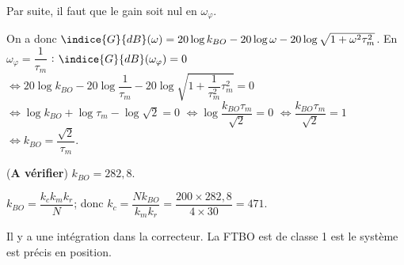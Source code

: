 Par suite, il faut que le gain soit nul en $\omega_{\varphi}$.

On a donc $\indice{G}{dB}(\omega)=20\log k_{BO}-20\log\omega-20\log\sqrt{1+\omega^2\tau_m^2}$.
En $\omega_{\varphi} =  \dfrac{1}{\tau_m}$ :
$\indice{G}{dB}(\omega_{\varphi})=0$ 
$\Leftrightarrow 20\log k_{BO}-20\log \dfrac{1}{\tau_m}-20\log\sqrt{1+\dfrac{1}{\tau_m^2}\tau_m^2}=0$
$\Leftrightarrow \log k_{BO}+\log \tau_m-\log\sqrt{2}=0$
$\Leftrightarrow \log \dfrac{k_{BO} \tau_m}{\sqrt{2}}=0$
$\Leftrightarrow \dfrac{k_{BO} \tau_m}{\sqrt{2}}=1$
$\Leftrightarrow k_{BO}=\dfrac{\sqrt{2}}{\tau_m}$.

(\textbf{A vérifier})
$k_{BO}=282,8$.

\else 
\fi

\ifprof
$k_{BO}=\dfrac{k_c k_m k_r}{N}$; donc 
$k_c=\dfrac{Nk_{BO}}{ k_m k_r} = \dfrac{200 \times 282,8 }{4\times 30}=471$.
\else 
\fi

\ifprof
Il y a une intégration dans la correcteur. La FTBO est de classe 1 est le système est précis en position. 
\else 
\fi

 

\ifprof
\else




\fi
